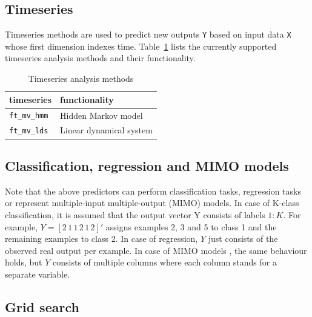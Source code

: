 \documentclass{article}
\renewcommand{\t}[1]{{\tt #1}}
\begin{document}
\subsection{Timeseries}

Timeseries methods are used to predict new outputs \t{Y} based on input data \t{X} whose first dimension indexes time. Table~\ref{timeseries} lists the currently supported timeseries analysis methods and their functionality.

\begin{table}[ht]
\centering
\caption{Timeseries analysis methods}
\begin{tabular}{p{}|p{}}
\bf{timeseries} & \bf{functionality}\\
\hline
\t{ft\_mv\_hmm} & Hidden Markov model\\
\t{ft\_mv\_lds} & Linear dynamical system
\end{tabular}
\label{timeseries}
\end{table}

\subsection{Classification, regression and MIMO models}

Note that the above predictors can perform classification tasks, regression tasks or represent multiple-input multiple-output (MIMO) models. In case of K-class classification, it is assumed that the output vector Y consists of labels $1:K$. For example, $Y = [2\,1\, 1\, 2\, 1\, 2]'$ assigns examples 2, 3 and 5 to class 1 and the remaining examples to class 2. In case of regression, $Y$ just consists of the observed real output per example. In case of MIMO models , the same behaviour holds, but $Y$ consists of multiple columns where each column stands for a separate variable.

\subsection{Grid search}
\end{document}
